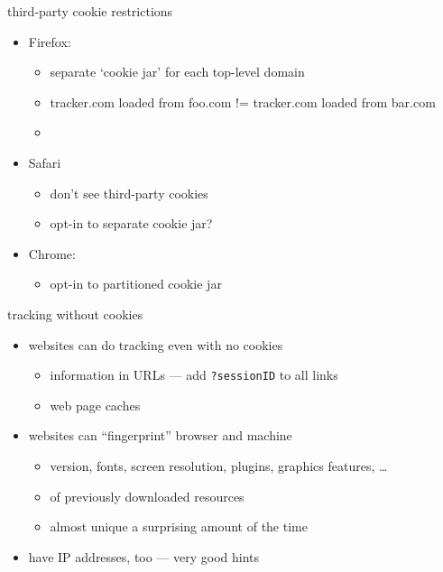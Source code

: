 \begin{frame}{third-party cookie restrictions}
    \begin{itemize}
    \item Firefox:
        \begin{itemize}
        \item separate `cookie jar' for each top-level domain
        \item tracker.com loaded from foo.com != tracker.com loaded from bar.com
        \item {}
        \end{itemize}
    \item Safari
        \begin{itemize}
        \item don't see third-party cookies
        \item opt-in to separate cookie jar?
        \end{itemize}
    \item Chrome:
        \begin{itemize}
        \item opt-in to partitioned cookie jar
        \end{itemize}
    \end{itemize}
\end{frame}



\begin{frame}[fragile,label=noCookieTrack]{tracking without cookies}
    \begin{itemize}
    \item websites can do tracking even with no cookies
        \begin{itemize}
        \item information in URLs --- add \texttt{?sessionID} to all links
        \item web page caches
        \end{itemize}
    \item websites can ``fingerprint'' browser and machine
        \begin{itemize}
        \item version, fonts, screen resolution, plugins, graphics features, \ldots
        \item {} of previously downloaded resources
        \item almost unique a surprising amount of the time
        \end{itemize}
    \item have IP addresses, too --- very good hints
    \end{itemize}
\end{frame}

